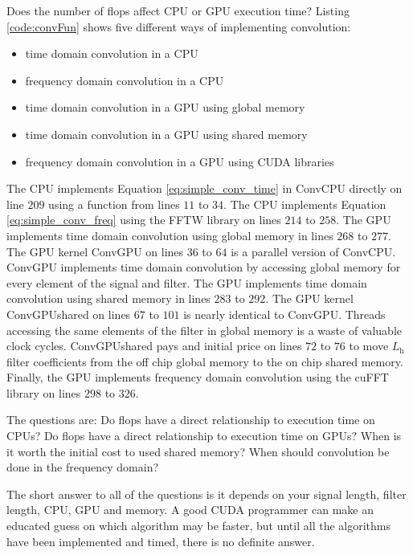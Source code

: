 Does the number of flops affect CPU or GPU execution time?
Listing \ref{code:convFun} shows five different ways of implementing convolution:
\begin{itemize}
  \item time domain convolution in a CPU
  \item frequency domain convolution in a CPU
  \item time domain convolution in a GPU using global memory
  \item time domain convolution in a GPU using shared memory
  \item frequency domain convolution in a GPU using CUDA libraries
\end{itemize}
The CPU implements Equation \eqref{eq:simple_conv_time} in ConvCPU directly on line $209$ using a function from lines $11$ to $34$.
The CPU implements Equation \eqref{eq:simple_conv_freq} using the FFTW library on lines $214$ to $258$.
The GPU implements time domain convolution using global memory in lines $268$ to $277$.
The GPU kernel ConvGPU on lines $36$ to $64$ is a parallel version of ConvCPU.
ConvGPU implements time domain convolution by accessing global memory for every element of the signal and filter.
The GPU implements time domain convolution using shared memory in lines $283$ to $292$.
The GPU kernel ConvGPUshared on lines $67$ to $101$ is nearly identical to ConvGPU.
Threads accessing the same elements of the filter in global memory is a waste of valuable clock cycles.
ConvGPUshared pays and initial price on lines $72$ to $76$ to move $L_\text{h}$ filter coefficients from the off chip global memory to the on chip shared memory.
Finally, the GPU implements frequency domain convolution using the cuFFT library on lines $298$ to $326$.


The questions are:
Do flops have a direct relationship to execution time on CPUs? 
Do flops have a direct relationship to execution time on GPUs? 
When is it worth the initial cost to used shared memory?
When should convolution be done in the frequency domain?

The short answer to all of the questions is it depends on your signal length, filter length, CPU, GPU and memory.
A good CUDA programmer can make an educated guess on which algorithm may be faster, but until all the algorithms have been implemented and timed, there is no definite answer.

